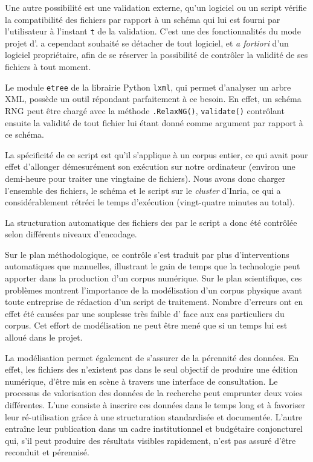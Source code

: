 Une autre possibilité est une validation externe, \cad{} qu'un logiciel ou un script vérifie la compatibilité des fichiers par rapport à un schéma qui lui est fourni par l'utilisateur à l'instant \texttt{t} de la validation. C'est une des fonctionnalités du mode \og projet \fg{} d'\oxygen. \timeus{} a cependant souhaité se détacher de tout logiciel, et \textit{a fortiori} d'un logiciel propriétaire, afin de se réserver la possibilité de contrôler la validité de ses fichiers à tout moment.

Le module \texttt{etree} de la librairie Python \texttt{lxml}, qui permet d'analyser un arbre XML, possède un outil répondant parfaitement à ce besoin. En effet, un schéma RNG peut être chargé avec la méthode \texttt{.RelaxNG()}, \texttt{validate()} contrôlant ensuite la validité de tout fichier lui étant donné comme argument par rapport à ce schéma.

La spécificité de ce script est qu'il s'applique à un corpus entier, ce qui avait pour effet d'allonger démesurément son exécution sur notre ordinateur (environ une demi-heure pour traiter une vingtaine de fichiers). Nous avons donc charger l'ensemble des fichiers, le schéma et le script sur le \textit{cluster} \rioc{} d'Inria, ce qui a considérablement rétréci le temps d'exécution  (vingt-quatre minutes au total).

\clearpage


La structuration automatique des fichiers des \odm{} par le script \lse{} a donc été contrôlée selon différents niveaux d'encodage.

Sur le plan méthodologique, ce contrôle s'est traduit par plus d'interventions automatiques que manuelles, illustrant le gain de temps que la technologie peut apporter dans la production d'un corpus numérique. Sur le plan scientifique, ces problèmes montrent l'importance de la modélisation d'un corpus physique avant toute entreprise de rédaction d'un script de traitement. Nombre d'erreurs ont en effet été causées par une souplesse très faible d'\lse{} face aux cas particuliers du corpus. Cet effort de modélisation ne peut être mené que si un temps lui est alloué dans le projet.

La modélisation permet également de s'assurer de la pérennité des données. En effet, les fichiers des \odm{} n'existent pas dans le seul objectif de produire une édition numérique, \cad{} d'être mis en scène à travers une interface de consultation. Le processus de valorisation des données de la recherche peut emprunter deux voies différentes. L'une consiste à inscrire ces données dans le temps long et à favoriser leur ré-utilisation grâce à une structuration standardisée et documentée. L'autre entraîne leur publication dans un cadre institutionnel et budgétaire conjoncturel qui, s'il peut produire des résultats visibles rapidement, n'est pas assuré d'être reconduit et pérennisé.

